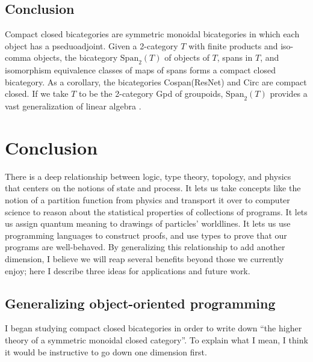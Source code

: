\documentclass[12pt,twoside,openright]{report}
\newcommand{\Span}{\mbox{Span}}
\begin{document}
\section{Conclusion}

Compact closed bicategories are symmetric monoidal bicategories in which each object has a pseduoadjoint.  Given a 2-category $T$ with finite products and iso-comma objects, the bicategory $\Span_2(T)$ of objects of $T$, spans in $T$, and isomorphism equivalence classes of maps of spans forms a compact closed bicategory.  As a corollary, the bicategories Cospan(ResNet) and Circ are compact closed.  If we take $T$ to be the 2-category Gpd of groupoids, $\Span_2(T)$ provides a vast generalization of linear algebra \cite{Gpdify}.

\chapter*{Conclusion}

There is a deep relationship between logic, type theory, topology, and physics that centers on the notions of state and process.  It lets us take concepts like the notion of a partition function from physics and transport it over to computer science to reason about the statistical properties of collections of programs.  It lets us assign quantum meaning to drawings of particles' worldlines.  It lets us use programming languages to construct proofs, and use types to prove that our programs are well-behaved.  By generalizing this relationship to add another dimension, I believe we will reap several benefits beyond those we currently enjoy; here I describe three ideas for applications and future work.

\section*{Generalizing object-oriented programming}
I began studying compact closed bicategories in order to write down ``the higher theory of a symmetric monoidal closed category''.  To explain what I mean, I think it would be instructive to go down one dimension first.
\end{document}
